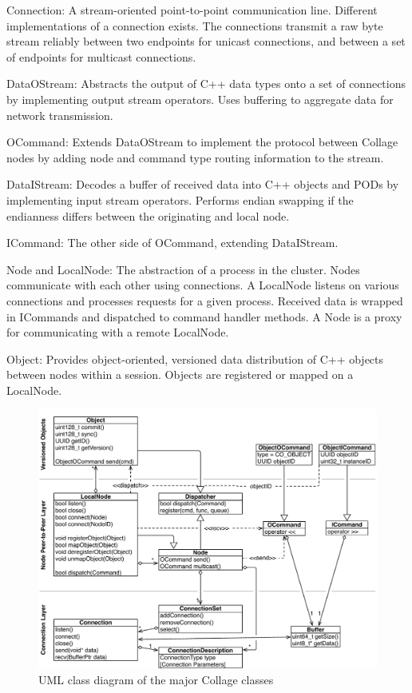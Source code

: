 \begin{compactdesc}

\item[Connection:] A stream-oriented point-to-point communication line. Different
implementations of a connection exists. The connections transmit a raw byte
stream reliably between two endpoints for unicast connections, and between a set
of endpoints for multicast connections.

\item[DataOStream:] Abstracts the output of C++ data types onto a set of
  connections by implementing output stream operators. Uses buffering to
  aggregate data for network transmission.
\item[OCommand:] Extends DataOStream to implement the protocol between Collage
  nodes by adding node and command type routing information to the stream.
\item[DataIStream:] Decodes a buffer of received data into C++ objects and PODs
  by implementing input stream operators. Performs endian swapping if the
  endianness differs between the originating and local node.
\item[ICommand:] The other side of OCommand, extending DataIStream.
\item[Node and LocalNode:] The abstraction of a process in the cluster. Nodes
  communicate with each other using connections. A LocalNode listens on various
  connections and processes requests for a given process. Received data is
  wrapped in ICommands and dispatched to command handler methods. A Node is a
  proxy for communicating with a remote LocalNode.
\item[Object:] Provides object-oriented, versioned data distribution of C++
  objects between nodes within a session. Objects are registered or mapped on a
  Local\-Node.
\end{compactdesc}

\begin{figure}[h!t]\center
  \includegraphics[width=\textwidth]{images/collageUML}
  {\caption{\label{fCollageUML}UML class diagram of the major Collage classes}}
\end{figure}

